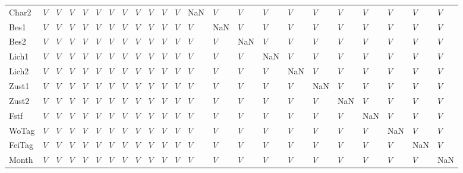 \begin{tabular}{lllllllllllllllllllllll}
Char2   &     $V$ &  $V$ &  $V$ &   $V$ &   $V$ &   $V$ &   $V$ &   $V$ &   $V$ &   $V$ &   $V$ &   NaN &  $V$ &  $V$ &   $V$ &   $V$ &   $V$ &   $V$ &  $V$ &   $V$ &    $V$ &   $V$ \\
Bes1    &     $V$ &  $V$ &  $V$ &   $V$ &   $V$ &   $V$ &   $V$ &   $V$ &   $V$ &   $V$ &   $V$ &   $V$ &  NaN &  $V$ &   $V$ &   $V$ &   $V$ &   $V$ &  $V$ &   $V$ &    $V$ &   $V$ \\
Bes2    &     $V$ &  $V$ &  $V$ &   $V$ &   $V$ &   $V$ &   $V$ &   $V$ &   $V$ &   $V$ &   $V$ &   $V$ &  $V$ &  NaN &   $V$ &   $V$ &   $V$ &   $V$ &  $V$ &   $V$ &    $V$ &   $V$ \\
Lich1   &     $V$ &  $V$ &  $V$ &   $V$ &   $V$ &   $V$ &   $V$ &   $V$ &   $V$ &   $V$ &   $V$ &   $V$ &  $V$ &  $V$ &   NaN &   $V$ &   $V$ &   $V$ &  $V$ &   $V$ &    $V$ &   $V$ \\
Lich2   &     $V$ &  $V$ &  $V$ &   $V$ &   $V$ &   $V$ &   $V$ &   $V$ &   $V$ &   $V$ &   $V$ &   $V$ &  $V$ &  $V$ &   $V$ &   NaN &   $V$ &   $V$ &  $V$ &   $V$ &    $V$ &   $V$ \\
Zust1   &     $V$ &  $V$ &  $V$ &   $V$ &   $V$ &   $V$ &   $V$ &   $V$ &   $V$ &   $V$ &   $V$ &   $V$ &  $V$ &  $V$ &   $V$ &   $V$ &   NaN &   $V$ &  $V$ &   $V$ &    $V$ &   $V$ \\
Zust2   &     $V$ &  $V$ &  $V$ &   $V$ &   $V$ &   $V$ &   $V$ &   $V$ &   $V$ &   $V$ &   $V$ &   $V$ &  $V$ &  $V$ &   $V$ &   $V$ &   $V$ &   NaN &  $V$ &   $V$ &    $V$ &   $V$ \\
Fstf    &     $V$ &  $V$ &  $V$ &   $V$ &   $V$ &   $V$ &   $V$ &   $V$ &   $V$ &   $V$ &   $V$ &   $V$ &  $V$ &  $V$ &   $V$ &   $V$ &   $V$ &   $V$ &  NaN &   $V$ &    $V$ &   $V$ \\
WoTag   &     $V$ &  $V$ &  $V$ &   $V$ &   $V$ &   $V$ &   $V$ &   $V$ &   $V$ &   $V$ &   $V$ &   $V$ &  $V$ &  $V$ &   $V$ &   $V$ &   $V$ &   $V$ &  $V$ &   NaN &    $V$ &   $V$ \\
FeiTag  &     $V$ &  $V$ &  $V$ &   $V$ &   $V$ &   $V$ &   $V$ &   $V$ &   $V$ &   $V$ &   $V$ &   $V$ &  $V$ &  $V$ &   $V$ &   $V$ &   $V$ &   $V$ &  $V$ &   $V$ &    NaN &   $V$ \\
Month   &     $V$ &  $V$ &  $V$ &   $V$ &   $V$ &   $V$ &   $V$ &   $V$ &   $V$ &   $V$ &   $V$ &   $V$ &  $V$ &  $V$ &   $V$ &   $V$ &   $V$ &   $V$ &  $V$ &   $V$ &    $V$ &   NaN \\
\bottomrule
\end{tabular}
